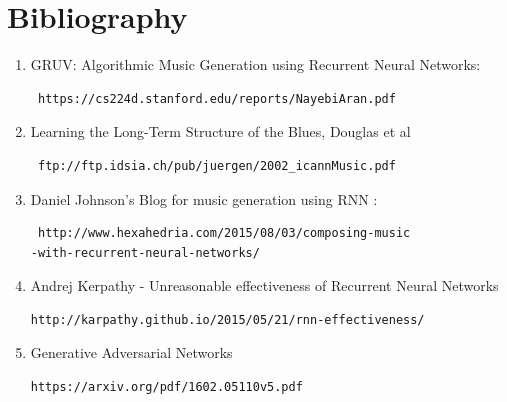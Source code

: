 \documentclass[11pt]{article}
\begin{document}
\section{Bibliography}
\begin{enumerate}
\item GRUV: Algorithmic Music Generation using
Recurrent Neural Networks: 
\begin{verbatim} https://cs224d.stanford.edu/reports/NayebiAran.pdf
\end{verbatim}
\item Learning the Long-Term Structure of the Blues, Douglas et al 
\begin{verbatim} ftp://ftp.idsia.ch/pub/juergen/2002_icannMusic.pdf

\end{verbatim}
\item Daniel Johnson's Blog for music generation using RNN :
\begin{verbatim} http://www.hexahedria.com/2015/08/03/composing-music
-with-recurrent-neural-networks/

\end{verbatim}
\item Andrej Kerpathy - Unreasonable effectiveness of Recurrent Neural Networks 
\begin{verbatim}http://karpathy.github.io/2015/05/21/rnn-effectiveness/

\end{verbatim}
\item Generative Adversarial Networks 
\begin{verbatim}https://arxiv.org/pdf/1602.05110v5.pdf

\end{verbatim}
\end{enumerate}
\end{document}
